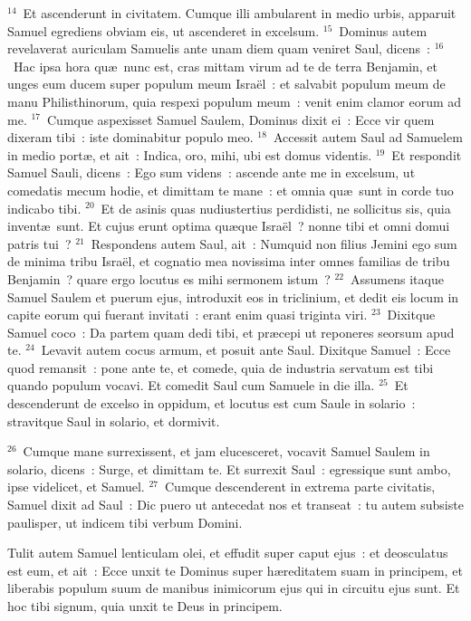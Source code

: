 ${}^{14}$~Et ascenderunt in civitatem. Cumque illi ambularent in medio urbis, apparuit Samuel egrediens obviam eis, ut ascenderet in excelsum.
${}^{15}$~Dominus autem revelaverat auriculam Samuelis ante unam diem quam veniret Saul, dicens~:
${}^{16}$~Hac ipsa hora qu\ae\ nunc est, cras mittam virum ad te de terra Benjamin, et unges eum ducem super populum meum Isra\"el~: et salvabit populum meum de manu Philisthinorum, quia respexi populum meum~: venit enim clamor eorum ad me.
${}^{17}$~Cumque aspexisset Samuel Saulem, Dominus dixit ei~: Ecce vir quem dixeram tibi~: iste dominabitur populo meo.
${}^{18}$~Accessit autem Saul ad Samuelem in medio port\ae , et ait~: Indica, oro, mihi, ubi est domus videntis.
${}^{19}$~Et respondit Samuel Sauli, dicens~: Ego sum videns~: ascende ante me in excelsum, ut comedatis mecum hodie, et dimittam te mane~: et omnia qu\ae\ sunt in corde tuo indicabo tibi.
${}^{20}$~Et de asinis quas nudiustertius perdidisti, ne sollicitus sis, quia invent\ae\ sunt. Et cujus erunt optima qu\ae que Isra\"el~? nonne tibi et omni domui patris tui~?
${}^{21}$~Respondens autem Saul, ait~: Numquid non filius Jemini ego sum de minima tribu Isra\"el, et cognatio mea novissima inter omnes familias de tribu Benjamin~? quare ergo locutus es mihi sermonem istum~?
${}^{22}$~Assumens itaque Samuel Saulem et puerum ejus, introduxit eos in triclinium, et dedit eis locum in capite eorum qui fuerant invitati~: erant enim quasi triginta viri.
${}^{23}$~Dixitque Samuel coco~: Da partem quam dedi tibi, et pr\ae cepi ut reponeres seorsum apud te.
${}^{24}$~Levavit autem cocus armum, et posuit ante Saul. Dixitque Samuel~: Ecce quod remansit~: pone ante te, et comede, quia de industria servatum est tibi quando populum vocavi. Et comedit Saul cum Samuele in die illa.
${}^{25}$~Et descenderunt de excelso in oppidum, et locutus est cum Saule in solario~: stravitque Saul in solario, et dormivit.


${}^{26}$~Cumque mane surrexissent, et jam elucesceret, vocavit Samuel Saulem in solario, dicens~: Surge, et dimittam te. Et surrexit Saul~: egressique sunt ambo, ipse videlicet, et Samuel.
${}^{27}$~Cumque descenderent in extrema parte civitatis, Samuel dixit ad Saul~: Dic puero ut antecedat nos et transeat~: tu autem subsiste paulisper, ut indicem tibi verbum Domini.

\lettrine[lines=10,image=true,loversize=0.05,lraise=-0.03]{T}{}ulit autem Samuel lenticulam olei, et effudit super caput ejus~: et deosculatus est eum, et ait~: Ecce unxit te Dominus super h\ae reditatem suam in principem, et liberabis populum suum de manibus inimicorum ejus qui in circuitu ejus sunt. Et hoc tibi signum, quia unxit te Deus in principem.


